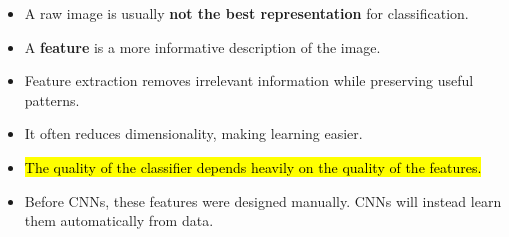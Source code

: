 \highspace
\begin{takeawaysbox}
    \begin{itemize}
        \item A raw image is usually \textbf{not the best representation} for classification.
        \item A \textbf{feature} is a more informative description of the image.
        \item Feature extraction removes irrelevant information while preserving useful patterns.
        \item It often reduces dimensionality, making learning easier.
        \item \hl{The quality of the classifier depends heavily on the quality of the features.}
        \item Before CNNs, these features were designed manually. CNNs will instead learn them automatically from data.
    \end{itemize}
\end{takeawaysbox}